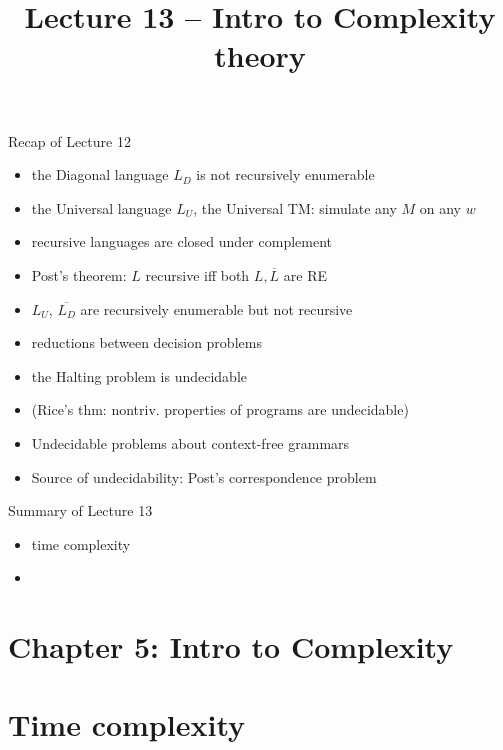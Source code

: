\documentclass[handout]{beamer}
\title{Lecture 13 -- Intro to Complexity theory}
\begin{document}
\frame{\titlepage}


\begin{frame}{Recap of Lecture 12}

    \begin{itemize}
        \item the Diagonal language $L_D$ is not recursively enumerable
        \item the Universal language $L_U$, the Universal TM: simulate any $M$ on any $w$
        \item recursive languages are closed under complement
        \item Post's theorem: $L$ recursive iff both $L,\overline{L}$ are RE
        \item $L_U$, $\overline{L_D}$ are recursively enumerable but not recursive
        \item reductions between decision problems
        \item the Halting problem is undecidable        
        \item (Rice's thm: nontriv. properties of programs are undecidable)
        \item Undecidable problems about context-free grammars
        \item Source of undecidability: Post's correspondence problem
    \end{itemize}

\end{frame}


\begin{frame}{Summary of Lecture 13}

    \begin{itemize}
        \item time complexity
        \item 
    \end{itemize}

\end{frame}


\section{\sc Chapter 5: Intro to Complexity}


\section*{Time complexity}
\end{document}

